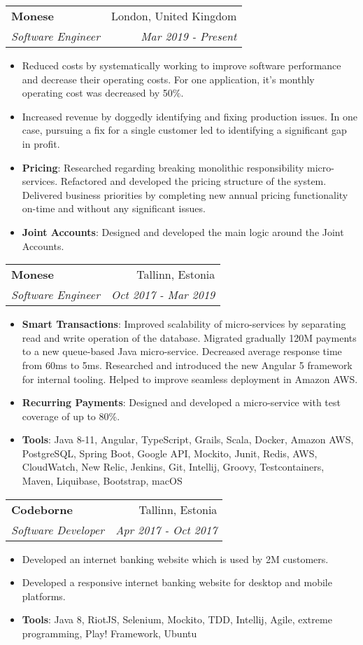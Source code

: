 \documentclass[letterpaper,11pt]{article}
\makeatletter
\newcommand{\resumeItem}[2]{
  \item\small{
    \textbf{#1}{: #2 \vspace{-2pt}}
  }
}
\newcommand{\resumeItemWithoutTitle}[2]{
  \item\small{
    \textbf{#1}{#2\vspace{-2pt}}
  }
}
\newcommand{\resumeSubheading}[4]{
  \vspace{-1pt}\item
    \begin{tabular*}{0.97\textwidth}[t]{l@{\extracolsep{\fill}}r}
      \textbf{#1} & #2 \\
      \textit{\small#3} & \textit{\small #4} \\
    \end{tabular*}\vspace{-5pt}
}
\newcommand{\resumeSubSubheading}[2]{
    \begin{tabular*}{0.97\textwidth}{l@{\extracolsep{\fill}}r}
      \textit{\small#1} & \textit{\small #2} \\
    \end{tabular*}\vspace{-5pt}
}
\newcommand{\resumeItemListStart}{\begin{itemize}}
\newcommand{\resumeItemListEnd}{\end{itemize}\vspace{-5pt}}
\makeatother
\begin{document}
    \resumeSubheading
      {Monese}{London, United Kingdom}
      {Software Engineer}{Mar 2019 - Present}
      \resumeItemListStart
        \resumeItemWithoutTitle{}
        {Reduced costs by systematically working to improve software performance and decrease their 
        operating costs. For one application, it’s monthly operating cost was decreased by 50\%.}
        \resumeItemWithoutTitle{}
        {Increased revenue by doggedly identifying and fixing production issues. In one case, 
        pursuing a fix for a single customer led to identifying a significant gap in profit.}
        \resumeItem{Pricing}
        {Researched regarding breaking monolithic responsibility micro-services. Refactored and 
        developed the pricing structure of the system. Delivered business priorities by completing 
        new annual pricing functionality on-time and without any significant issues.}
        \resumeItem{Joint Accounts}
        {Designed and developed the main logic around the Joint Accounts.}
      \resumeItemListEnd

  \resumeSubheading
  {Monese}{Tallinn, Estonia}
  {Software Engineer}{Oct 2017 - Mar 2019}
  \resumeItemListStart
    \resumeItem{Smart Transactions}
      {Improved scalability of micro-services by separating read and write operation of the database. 
      Migrated gradually 120M payments to a new queue-based Java micro-service. Decreased average response
      time from 60ms to 5ms. Researched and introduced the new Angular 5 framework for internal tooling. 
      Helped to improve seamless deployment in Amazon AWS.}
    \resumeItem{Recurring Payments}
      {Designed and developed a micro-service with test coverage of up to 80\%.}
    \resumeItem{Tools}
      {Java 8-11, Angular, TypeScript, Grails, Scala, Docker, Amazon AWS, PostgreSQL, Spring Boot, 
      Google API, Mockito, Junit, Redis, AWS, CloudWatch, New Relic, Jenkins, Git, Intellij, Groovy, 
      Testcontainers, Maven, Liquibase, Bootstrap, macOS}
  \resumeItemListEnd
    \resumeSubheading
      {Codeborne}{Tallinn, Estonia}
      {Software Developer}{Apr 2017 - Oct 2017}
      \resumeItemListStart
        \resumeItemWithoutTitle{}
          {Developed an internet banking website which is used by 2M customers.}
        \resumeItemWithoutTitle{}
          {Developed a responsive internet banking website for desktop and mobile platforms.}
        \resumeItem{Tools}
        {Java 8, RiotJS, Selenium, Mockito, TDD, Intellij, Agile, extreme programming, Play! Framework, 
        Ubuntu}
      \resumeItemListEnd
\end{document}
